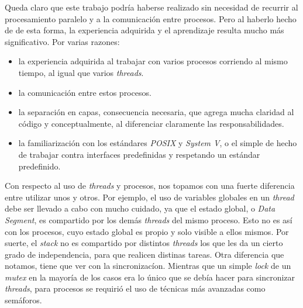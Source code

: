 \documentclass[a4paper,10pt]{article}
\begin{document}
Queda claro que este trabajo podría haberse realizado sin necesidad de recurrir al procesamiento paralelo y a la comunicación entre procesos. Pero al haberlo 
hecho de de esta forma, la experiencia adquirida y el aprendizaje resulta mucho más significativo. Por varias razones:

\begin{itemize}
\item la experiencia adquirida al trabajar con varios procesos corriendo al mismo tiempo, al igual que varios \textit{threads}.
\item la comunicación entre estos procesos.
\item la separación en capas, consecuencia necesaria, que agrega mucha claridad al código y conceptualmente, al diferenciar claramente las responsabilidades.
\item la familiarización con los estándares \textit{POSIX} y \textit{System V}, o el simple de hecho de trabajar contra interfaces predefinidas y respetando
      un estándar predefinido.
\end{itemize}

Con respecto al uso de \textit{threads}  y procesos, nos topamos con una fuerte diferencia entre utilizar unos y otros. Por ejemplo, el uso de variables globales 
en un \textit{thread} debe ser llevado a cabo con mucho cuidado, ya que el estado global, o \textit{Data Segment}, es compartido por los demás \textit{threads} del mismo
proceso. Esto no es así con los procesos, cuyo estado global es propio y solo visible a ellos mismos. Por suerte, el \textit{stack} no es compartido por distintos \textit{threads}
los que les da un cierto grado de independencia, para que realicen distinas tareas. Otra diferencia que notamos, tiene que ver con la sincronizacíon. Mientras que un
simple \textit{lock} de un \textit{mutex} en la mayoría de los casos era lo único que se debía hacer para sincronizar \textit{threads}, para procesos se requirió el uso
de técnicas más avanzadas como semáforos.
\end{document}
